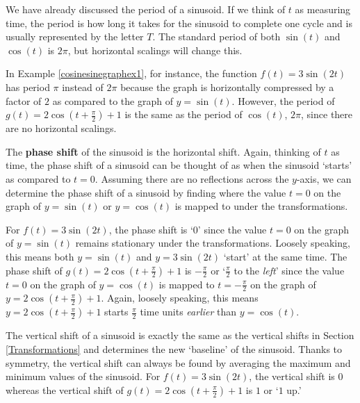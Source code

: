 
 \smallskip

We have already discussed the period of a sinusoid.  If we think of $t$ as measuring time, the period is how long it takes for the sinusoid to complete one cycle and is usually represented by the letter $T$.   The standard period of both  $\sin(t)$ and $\cos(t)$  is $2\pi$, but horizontal scalings will change  this.

\smallskip

  In Example \ref{cosinesinegraphex1}, for instance,  the function  $f(t) = 3 \sin(2t)$ has period  $\pi$ instead of $2\pi$ because the graph is horizontally compressed by a factor of $2$ as compared to the graph of $y = \sin(t)$.    However, the period of  $g(t) = 2 \cos\left(t +\frac{\pi}{2} \right) +1$ is the same as the period of $\cos(t)$, $2\pi$, since there are no horizontal scalings.
  
  \smallskip
  


The \textbf{phase shift} of the sinusoid is the horizontal shift. Again, thinking of $t$ as time, the phase shift of a sinusoid can be thought of as when the sinusoid `starts' as compared to $t=0$.   Assuming there are no reflections across the $y$-axis, we can determine the phase shift of a sinusoid by finding where the value $t=0$ on the graph of $y = \sin(t)$ or $y=\cos(t)$ is mapped to under the transformations.  


\smallskip

For $f(t) = 3 \sin(2t)$, the phase shift is `$0$' since the value $t=0$ on the graph of $y = \sin(t)$ remains stationary under the transformations. Loosely speaking, this means both $y=\sin(t)$ and $y=3\sin(2t)$ `start' at the same time.  The phase shift of  $g(t) = 2 \cos\left(t +\frac{\pi}{2} \right) +1$ is $-\frac{\pi}{2}$ or `$\frac{\pi}{2}$ to the \textit{left}' since the value $t = 0$ on the graph of $y=\cos(t)$ is mapped to $t = -\frac{\pi}{2}$ on the graph of $y= 2 \cos\left(t +\frac{\pi}{2} \right) +1$.  Again, loosely speaking, this means $y=2 \cos\left(t +\frac{\pi}{2} \right) +1$ starts $\frac{\pi}{2}$ time units \textit{earlier} than $y=\cos(t)$.

  \smallskip
  


 The vertical shift of a sinusoid is exactly the same as the vertical shifts in Section \ref{Transformations} and determines the new `baseline' of the sinusoid.  Thanks to symmetry, the vertical shift can always be found by averaging the maximum and minimum values of the sinusoid.  For $f(t) = 3 \sin(2t)$, the vertical shift is $0$ whereas the vertical shift of $g(t) = 2 \cos\left(t +\frac{\pi}{2} \right) +1$ is $1$ or `$1$ up.'


